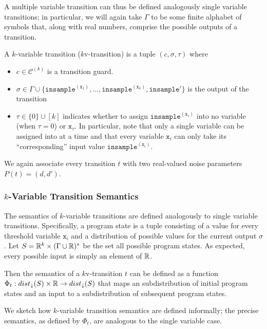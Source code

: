 A multiple variable transition can thus be defined analogously single variable transitions; in particular, we will again take $\Gamma$ to be some finite alphabet of symbols that, along with real numbers, comprise the possible outputs of a transition. 

\begin{defn}
    A $k$-variable transition ($k$v-transition) is a tuple $(c, \sigma, \tau)$ where \begin{itemize}
        \item $c\in\mathcal{C}^{(k)}$ is a transition guard.
        \item $\sigma\in\Gamma\cup\{\texttt{insample}^{(\texttt{x}_1)}, \ldots, \texttt{insample}^{(\texttt{x}_k)}, \texttt{insample}'\}$ is the output of the transition
        \item $\tau \in \{0\} \cup [k]$ indicates whether to assign $\texttt{insample}^{(\texttt{x}_\tau)}$ into no variable (when $\tau = 0$) or $\texttt{x}_\tau$. In particular, note that only a single variable can be assigned into at a time and that every variable $\texttt{x}_i$ can only take its ``corresponding'' input value $\texttt{insample}^{(\texttt{x}_i)}$. 
    \end{itemize}
\end{defn}

We again associate every transition $t$ with two real-valued noise parameters $P(t) = (d, d')$.

\subsubsection{$k$-Variable Transition Semantics}

The semantics of $k$-variable transitions are defined analogously to single variable transitions. Specifically, a program state is a tuple consisting of a value for every threshold variable $\texttt{x}_i$ and a distribution of possible values for the current output $\sigma$. Let $S =\mathbb{R}^k\times (\Gamma\cup \mathbb{R})^*$ be the set all possible program states. As expected, every possible input is simply an element of $\mathbb{R}$. 

Then the semantics of a $k$v-transition $t$ can be defined as a function $\Phi_t: dist_\downarrow(S)\times \mathbb{R}\to dist_\downarrow(S)$ that maps an subdistribution of initial program states and an input to a subdistribution of subsequent program states.

We sketch how $k$-variable transition semantics are defined informally; the precise semantics, as defined by $\Phi_t$, are analogous to the single variable case.

